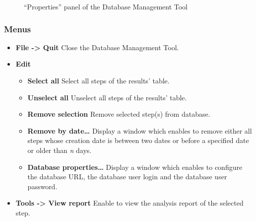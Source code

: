 {\begin{figure}[ht]
	\begin{center}
	\end{center}
	\caption{``Properties'' panel of the Database Management Tool}
	\label{stepProperties}
\end{figure}

\subsubsection{Menus}

\begin{itemize}
  \item{\textbf{File -> Quit}} Close the Database Management Tool.
  \item{\textbf{Edit}}
	\begin{itemize}
      \item{\textbf{Select all}} Select all steps of the results' table.
      \item{\textbf{Unselect all}} Unselect all steps of the results' table.
      \item{\textbf{Remove selection}} Remove selected step(s) from database.
      \item{\textbf{Remove by date\ldots}} Display a window which enables to
      remove either all steps whose creation date is between two dates or before
      a specified date or older than \emph{n} days.
      \item{\textbf{Database properties\ldots}} Display a window which enables to
      configure the database URL, the database user login and the database user password.
    \end{itemize}
  \item{\textbf{Tools -> View report}} Enable to view the analysis report of the
  selected step.
\end{itemize}

}{}

